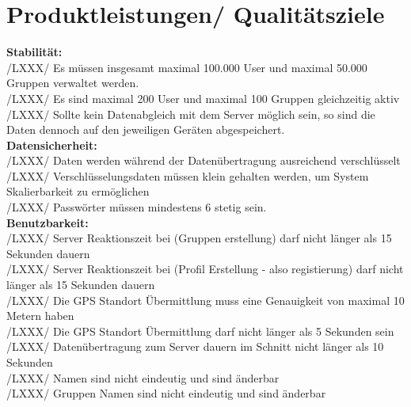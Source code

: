 \section{Produktleistungen/ Qualitätsziele}
\textbf{Stabilität:}\\
/LXXX/	Es müssen insgesamt maximal 100.000 User und maximal 50.000 Gruppen verwaltet werden. \\
/LXXX/	Es sind maximal 200 User und maximal 100 Gruppen gleichzeitig aktiv \\
/LXXX/	Sollte kein Datenabgleich mit dem Server möglich sein, so sind die Daten dennoch  auf den jeweiligen Geräten abgespeichert.	  \\
\textbf{Datensicherheit:}\\
/LXXX/	Daten werden während der Datenübertragung ausreichend verschlüsselt\\
/LXXX/	Verschlüsselungsdaten müssen klein gehalten werden, um System Skalierbarkeit zu ermöglichen\\
/LXXX/	Passwörter müssen mindestens 6 stetig sein.\\
\textbf{Benutzbarkeit:}\\
/LXXX/	Server Reaktionszeit bei (Gruppen erstellung) darf nicht länger als 15 Sekunden dauern\\
/LXXX/	Server Reaktionszeit bei (Profil Erstellung - also registierung) darf nicht länger als 15 Sekunden dauern\\
/LXXX/	Die GPS Standort Übermittlung muss eine Genauigkeit von maximal 10 Metern haben\\
/LXXX/	Die GPS Standort Übermittlung darf nicht länger als 5 Sekunden sein  \\
/LXXX/	Datenübertragung zum Server dauern im Schnitt nicht länger als 10 Sekunden\\
/LXXX/	Namen sind nicht eindeutig und sind änderbar\\
/LXXX/	Gruppen Namen sind nicht eindeutig und sind änderbar\\